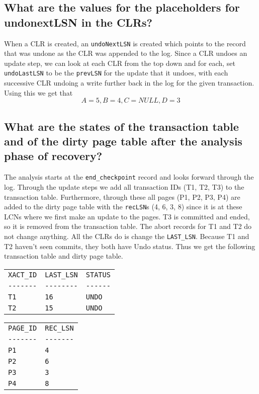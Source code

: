 \documentclass{article}
\begin{document}
\subsection{What are the values for the placeholders for undonextLSN in the CLRs?}

When a CLR is created, an \verb|undoNextLSN| is created which points to the record that was undone as the CLR was appended to the log. Since a CLR undoes an update step, we can look at each CLR from the top down and for each, set \verb|undoLastLSN| to be the \verb|prevLSN| for the update that it undoes, with each successive CLR undoing a write further back in the log for the given transaction.  Using this we get that
$$
A=5,B=4,C=NULL,D=3
$$

\subsection{What are the states of the transaction table and of the dirty page table after the analysis phase of recovery?}

The analysis starts at the \verb|end_checkpoint| record and looks forward through the log. Through the update steps we add all transaction IDs (T1, T2, T3) to the transaction table. Furthermore, through these all pages (P1, P2, P3, P4) are added to the dirty page table with the \verb|recLSN|s (4, 6, 3, 8) since it is at these LCNs where we first make an update to the pages. T3 is committed and ended, so it is removed from the transaction table. The abort records for T1 and T2 do not change anything. All the CLRs do is change the \verb|LAST_LSN|. Because T1 and T2 haven't seen commits, they both have Undo status. Thus we get the following transaction table and dirty page table.

\begin{table}[h]
    \centering
    \begin{tabular}{lll}
        \verb|XACT_ID| & \verb|LAST_LSN| & \verb|STATUS| \\
        \verb|-------| & \verb|--------| & \verb|------| \\
        \verb|T1| & \verb|16| & \verb|UNDO| \\
        \verb|T2| & \verb|15| & \verb|UNDO| \\
    \end{tabular}
\end{table}

\begin{table}[h]
    \centering
    \begin{tabular}{ll}
        \verb|PAGE_ID| & \verb|REC_LSN| \\
        \verb|-------| & \verb|-------| \\
        \verb|P1| & \verb|4| \\
        \verb|P2| & \verb|6| \\
        \verb|P3| & \verb|3| \\
        \verb|P4| & \verb|8| \\
    \end{tabular}
\end{table}
\end{document}
